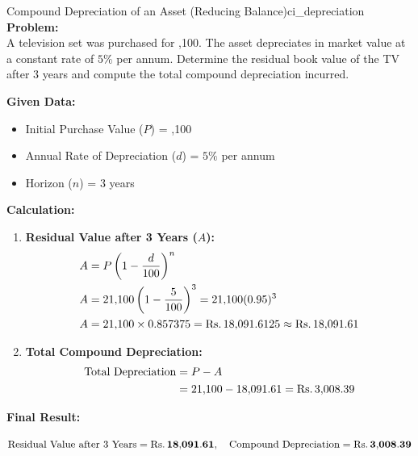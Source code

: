 \begin{example}{Compound Depreciation of an Asset (Reducing Balance)}{ci_depreciation}
\textbf{Problem:} \\
A television set was purchased for ,100. The asset depreciates in market value at a constant rate of $5\%$ per annum. Determine the residual book value of the TV after $3$ years and compute the total compound depreciation incurred.

\tcbline
\textbf{Given Data:}
\begin{itemize}[noitemsep]
    \item Initial Purchase Value ($P$) = ,100
    \item Annual Rate of Depreciation ($d$) = $5\%$ per annum
    \item Horizon ($n$) = $3$ years
\end{itemize}

\textbf{Calculation:}
\begin{enumerate}[leftmargin=*]
    \item \textbf{Residual Value after 3 Years ($A$):}
    \begin{align*}
        A &= P\left(1 - \frac{d}{100}\right)^n \\
        A &= 21{,}100\left(1 - \frac{5}{100}\right)^3 = 21{,}100(0.95)^3 \\
        A &= 21{,}100 \times 0.857375 = \text{Rs.}\, 18{,}091.6125 \approx \text{Rs.}\, 18{,}091.61
    \end{align*}
    
    \item \textbf{Total Compound Depreciation:}
    \begin{align*}
        \text{Total Depreciation} &= P - A \\
        &= 21{,}100 - 18{,}091.61 = \text{Rs.}\, 3{,}008.39
    \end{align*}
\end{enumerate}

\textbf{Final Result:}
\begin{center}
    $\text{Residual Value after 3 Years} = \mathbf{\text{Rs.}\, 18{,}091.61}, \quad \text{Compound Depreciation} = \mathbf{\text{Rs.}\, 3{,}008.39}$
\end{center}
\end{example}

